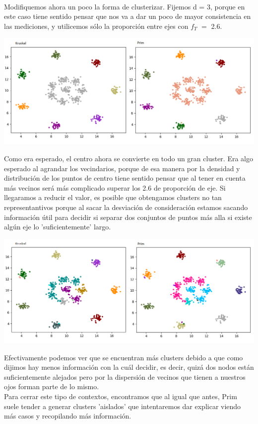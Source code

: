 \documentclass[11pt,a4paper]{article}
\begin{document}
\\
Modifiquemos ahora un poco la forma de clusterizar. Fijemos d = 3, porque en este caso tiene sentido pensar que nos va a dar un poco de mayor consistencia en las mediciones, y utilicemos sólo la proporción entre ejes con $f_{T}$ $=$ 2.6.
\begin{center}
\includegraphics[scale=.5]{graficos/r15_2.png}
\end{center}
Como era esperado, el centro ahora se convierte en todo un gran cluster. Era algo esperado al agrandar los vecindarios, porque de esa manera por la densidad y distribución de los puntos de centro tiene sentido pensar que al tener en cuenta más vecinos será más complicado superar los 2.6 de proporción de eje. Si llegaramos a reducir el valor, es posible que obtengamos clusters no tan representantivos porque al sacar la desviación de consideración estamos sacando información útil para decidir si separar dos conjuntos de puntos más alla si existe algún eje lo 'suficientemente' largo.
\begin{center}
\includegraphics[scale=.5]{graficos/r15_3.png}
\end{center}
Efectivamente podemos ver que se encuentran más clusters debido a que como dijimos hay menos información con la cuál decidir, es decir, quizá dos nodos están suficientemente alejados pero por la dispersión de vecinos que tienen a nuestros ojos forman parte de lo mismo.\\
Para cerrar este tipo de contextos, encontramos que al igual que antes, Prim suele tender a generar clusters 'aislados' que intentaremos dar explicar viendo más casos y recopilando más información.
\\
\end{document}
